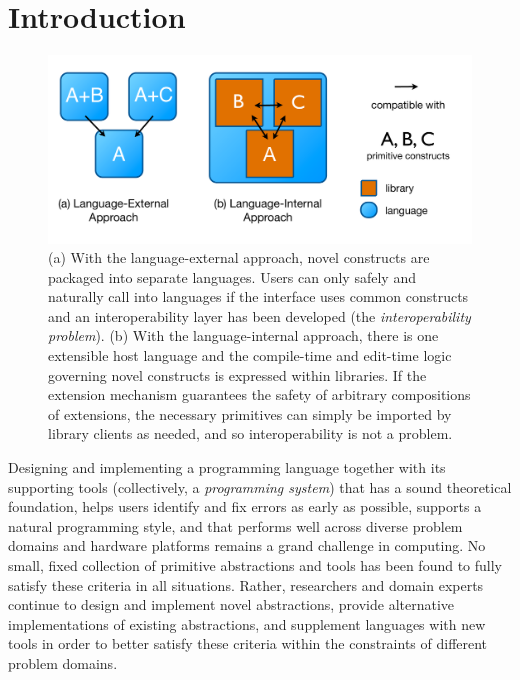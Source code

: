 \section{Introduction}\begin{figure}
\begin{center}
\includegraphics[scale=0.45]{approaches.pdf}
\end{center}
\vspace{-20px}
\caption{\small (a) With the language-external approach, novel constructs are packaged into separate languages. Users can only safely and naturally call into languages if the interface uses common constructs and an interoperability layer has been developed (the \emph{interoperability problem}). (b) With the language-internal approach, there is one extensible host language and the compile-time and edit-time logic governing novel constructs is expressed within libraries. If the extension mechanism guarantees the safety of arbitrary compositions of extensions, the necessary primitives can simply be imported by library clients as needed, and so interoperability is not a problem.}
\label{approaches}
\end{figure}
Designing and implementing a programming language together with its supporting tools (collectively, a \emph{programming system}) that has a sound theoretical foundation, helps users identify and fix errors as early as possible, supports a natural programming style, and that performs well across diverse problem domains and hardware platforms remains a grand challenge in computing. No small, fixed collection of primitive abstractions and tools has been found to fully satisfy these criteria in all situations. Rather, researchers and domain experts  continue to design and implement novel abstractions, provide alternative implementations of existing abstractions, and supplement languages with new tools in order to better satisfy these criteria within the constraints of different problem domains.

